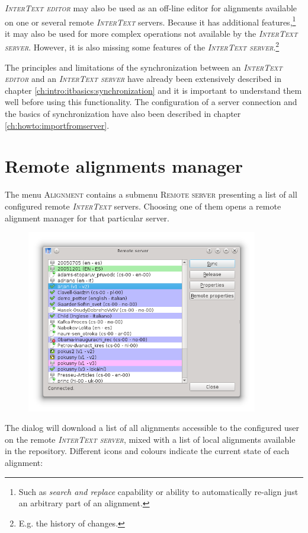 \documentclass[a4paper,10pt,oneside]{book}
\newcommand{\IT}{\textit{\textsc{InterText}}\xspace}
\newcommand{\ITeditor}{\textit{\textsc{InterText editor}}\xspace}
\newcommand{\ITserver}{\textit{\textsc{InterText server}}\xspace}
\newcommand{\menu}[1]{\textsc{#1}}
\begin{document}
\ITeditor may also be used as an off-line editor for alignments available on one or several remote \IT servers. Because it has additional features,\footnote{Such as \emph{search and replace} capability or ability to automatically re-align just an arbitrary part of an alignment.} it may also be used for more complex operations not available by the \ITserver. However, it is also missing some features of the \ITserver.\footnote{E.g. the history of changes.}

The principles and limitations of the synchronization between an \ITeditor and an \ITserver have already been extensively described in chapter \ref{ch:intro:itbasics:synchronization} and it is important to understand them well before using this functionality. The configuration of a server connection and the basics of synchronization have also been described in chapter \ref{ch:howto:importfromserver}.

\section{Remote alignments manager}\label{ch:detail:managing_remote:manager}

The menu \menu{Alignment} contains a submenu \menu{Remote server} presenting a list of all configured remote \IT servers. Choosing one of them opens a remote alignment manager for that particular server.

\begin{figure}[htb]
 \includegraphics[width=0.9\textwidth]{screenshots/remote_manager.png}
\end{figure}

The dialog will download a list of all alignments accessible to the configured user on the remote \ITserver, mixed with a list of local alignments available in the repository. Different icons and colours indicate the current state of each alignment:
\end{document}
